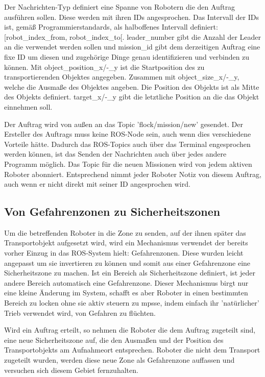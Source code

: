 Der Nachrichten-Typ definiert eine Spanne von Robotern die den Auftrag ausführen sollen. Diese werden mit ihren IDs angesprochen. Das Intervall der IDs ist, gemäß Programmierstandards, als halboffenes Intervall definiert: [robot\_index\_from, robot\_index\_to[.
leader\_number gibt die Anzahl der Leader an die verwendet werden sollen und mission\_id gibt dem derzeitigen Auftrag eine fixe ID um diesen und zugehörige Dinge genau identifizieren und verbinden zu können.
Mit object\_position\_x/-\_y ist die Startposition des zu transportierenden Objektes angegeben. Zusammen mit object\_size\_x/-\_y, welche die Ausmaße des Objektes angeben. Die Position des Objekts ist als Mitte des Objekts definiert.
target\_x/-\_y gibt die letztliche Position an die das Objekt einnehmen soll.

Der Auftrag wird von außen an das Topic 'flock/mission/new' gesendet. Der Ersteller des Auftrags muss keine ROS-Node sein, auch wenn dies verschiedene Vorteile hätte. Dadurch das ROS-Topics auch über das Terminal engesprochen werden können, ist das Senden der Nachrichten auch über jedes andere Programm möglich. Das Topic für die neuen Missionen wird von jedem aktiven Roboter abonniert. Entsprechend nimmt jeder Roboter Notiz von diesem Auftrag, auch wenn er nicht direkt mit seiner ID angesprochen wird.

\subsection*{Von Gefahrenzonen zu Sicherheitszonen}

Um die betreffenden Roboter in die Zone zu senden, auf der ihnen später das Transportobjekt aufgesetzt wird, wird ein Mechanismus verwendet der bereits vorher Einzug in das ROS-System hielt: Gefahrenzonen. Diese wurden leicht angepasst um sie invertieren zu können und somit aus einer Gefahrenzone eine Sicherheitszone zu machen. Ist ein Bereich als Sicherheitszone definiert, ist jeder andere Bereich automatisch eine Gefahrenzone.
Dieser Mechanismus birgt nur eine kleine Änderung im System, schafft es aber Roboter in einen bestimmten Bereich zu locken ohne sie aktiv steuern zu mpsse, indem einfach ihr 'natürlicher' Trieb verwendet wird, von Gefahren zu flüchten.

Wird ein Auftrag erteilt, so nehmen die Roboter die dem Auftrag zugeteilt sind, eine neue Sicherheitszone auf, die den Ausmaßen und der Position des Transportobjekts am Aufnahmeort entsprechen. Roboter die nicht dem Transport zugeteilt wurden, werden diese neue Zone als Gefahrenzone auffassen und versuchen sich diesem Gebiet fernzuhalten.

